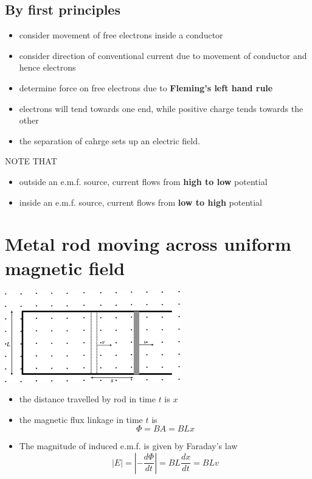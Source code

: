 \documentclass[a4paper, 10pt]{article}
\begin{document}
\subsection{By first principles}

\begin{itemize}
   \item consider movement of free electrons inside a conductor
   \item consider direction of conventional current due to movement of conductor and hence electrons
   \item determine force on free electrons due to \textbf{Fleming's left hand rule}
   \item electrons will tend towards one end, while positive charge tends towards the other
   \item the separation of cahrge sets up an electric field. 
\end{itemize}	

\begin{framed}
   NOTE THAT 
   \begin{itemize}
      \item outside an e.m.f. source, current flows from \textbf{high to low} potential
      \item inside an e.m.f. source, current flows from \textbf{low to high} potential
   \end{itemize}	
\end{framed}	

\section{Metal rod moving across uniform magnetic field}

\begin{center}
   \includegraphics[width=3in]{figures/3.pdf} 
\end{center}	
\begin{itemize}
   \item the distance travelled by rod in time $t$ is $x$
   \item the magnetic flux linkage in time $t$ is 
      \[
      \Phi = BA = BLx
      \]
   \item The magnitude of induced e.m.f. is given by Faraday's law
      \[
      |E| = \left| - \frac{d\Phi}{dt}\right| = BL \frac{dx}{dt} = BLv
      \]
\end{itemize}	
\end{document}
